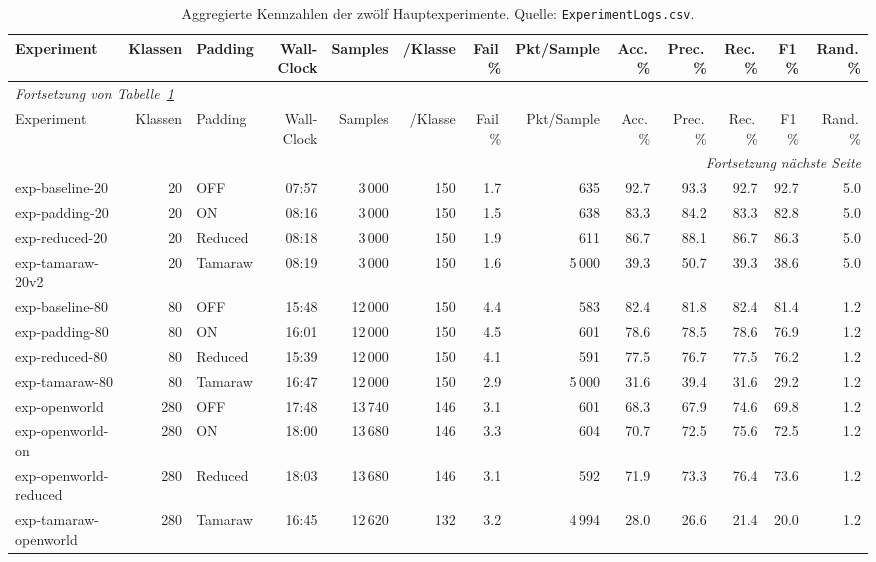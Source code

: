 \begin{landscape}
\footnotesize
\setlength{\tabcolsep}{4pt}
\begin{longtable}{lrlrrrrrrrrrr}
\caption{Aggregierte Kennzahlen der zwölf Hauptexperimente. Quelle: \texttt{ExperimentLogs.csv}.} \label{tab:experimentlogs} \\
\hline
Experiment & Klassen & Padding & Wall-Clock & Samples & /Klasse & Fail\,\% & Pkt/Sample & Acc.\,\% & Prec.\,\% & Rec.\,\% & F1\,\% & Rand.\,\% \\
\hline
\endfirsthead
\multicolumn{13}{l}{\textit{Fortsetzung von Tabelle~\ref{tab:experimentlogs}}} \\
\hline
Experiment & Klassen & Padding & Wall-Clock & Samples & /Klasse & Fail\,\% & Pkt/Sample & Acc.\,\% & Prec.\,\% & Rec.\,\% & F1\,\% & Rand.\,\% \\
\hline
\endhead
\hline
\multicolumn{13}{r}{\textit{Fortsetzung nächste Seite}} \\
\endfoot
\hline
\endlastfoot
exp-baseline-20       &  20 & OFF     & 07:57 &  3\,000 & 150 & 1.7 &    635 & 92.7 & 93.3 & 92.7 & 92.7 & 5.0 \\
exp-padding-20        &  20 & ON      & 08:16 &  3\,000 & 150 & 1.5 &    638 & 83.3 & 84.2 & 83.3 & 82.8 & 5.0 \\
exp-reduced-20        &  20 & Reduced & 08:18 &  3\,000 & 150 & 1.9 &    611 & 86.7 & 88.1 & 86.7 & 86.3 & 5.0 \\
exp-tamaraw-20v2      &  20 & Tamaraw & 08:19 &  3\,000 & 150 & 1.6 & 5\,000 & 39.3 & 50.7 & 39.3 & 38.6 & 5.0 \\
exp-baseline-80       &  80 & OFF     & 15:48 & 12\,000 & 150 & 4.4 &    583 & 82.4 & 81.8 & 82.4 & 81.4 & 1.2 \\
exp-padding-80        &  80 & ON      & 16:01 & 12\,000 & 150 & 4.5 &    601 & 78.6 & 78.5 & 78.6 & 76.9 & 1.2 \\
exp-reduced-80        &  80 & Reduced & 15:39 & 12\,000 & 150 & 4.1 &    591 & 77.5 & 76.7 & 77.5 & 76.2 & 1.2 \\
exp-tamaraw-80        &  80 & Tamaraw & 16:47 & 12\,000 & 150 & 2.9 & 5\,000 & 31.6 & 39.4 & 31.6 & 29.2 & 1.2 \\
exp-openworld         & 280 & OFF     & 17:48 & 13\,740 & 146 & 3.1 &    601 & 68.3 & 67.9 & 74.6 & 69.8 & 1.2 \\
exp-openworld-on      & 280 & ON      & 18:00 & 13\,680 & 146 & 3.3 &    604 & 70.7 & 72.5 & 75.6 & 72.5 & 1.2 \\
exp-openworld-reduced & 280 & Reduced & 18:03 & 13\,680 & 146 & 3.1 &    592 & 71.9 & 73.3 & 76.4 & 73.6 & 1.2 \\
exp-tamaraw-openworld & 280 & Tamaraw & 16:45 & 12\,620 & 132 & 3.2 & 4\,994 & 28.0 & 26.6 & 21.4 & 20.0 & 1.2 \\
\end{longtable}
\normalsize
\end{landscape}

